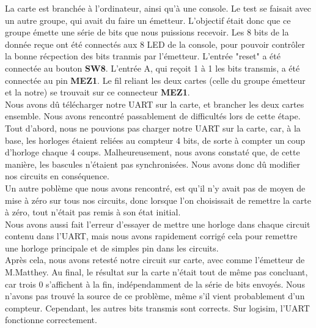 \documentclass[a4paper]{article} %
\begin{document}
\begin{tcolorbox}[colframe=Monokaimagenta,colback=white]
La carte est branchée à l'ordinateur, ainsi qu'à une console. Le test se faisait avec un autre groupe, qui avait du faire un émetteur. L'objectif était donc que ce groupe émette une série de bits que nous puissions recevoir.
Les 8 bits de la donnée reçue ont été connectés aux 8 LED de la console, pour pouvoir contrôler la bonne récpection des bits tranmis par l'émetteur. L'entrée "reset" a été connectée au bouton \textbf{SW8}. L'entrée A, qui reçoit 1 à 1 les bits transmis, a été connectée au pin \textbf{MEZ1}. Le fil reliant les deux cartes (celle du groupe émetteur et la notre) se trouvait sur ce connecteur \textbf{MEZ1}.\\
Nous avons dû télécharger notre UART sur la carte, et brancher les deux cartes ensemble.
Nous avons rencontré passablement de difficultés lors de cette étape. Tout d'abord, nous ne pouvions pas charger notre UART sur la carte, car, à la base, les horloges étaient reliées au compteur 4 bits, de sorte à compter un coup d'horloge chaque 4 coups. Malheureusement, nous avons constaté que, de cette manière, les bascules n'étaient pas synchronisées. Nous avons donc dû modifier nos circuits en conséquence.\\
Un autre poblème que nous avons rencontré, est qu'il n'y avait pas de moyen de mise à zéro sur tous nos circuits, donc lorsque l'on choisissait de remettre la carte à zéro, tout n'était pas remis à son état initial.\\
Nous avons aussi fait l'erreur d'essayer de mettre une horloge dans chaque circuit contenu dans l'UART, mais nous avons rapidement corrigé cela pour remettre une horloge principale et de simples pin dans les circuits.\\
Après cela, nous avons retesté notre circuit sur carte, avec comme l'émetteur de M.Matthey. Au final, le résultat sur la carte n'était tout de même pas concluant, car trois $0$ s'affichent à la fin, indépendamment de la série de bits envoyés. Nous n'avons pas trouvé la source de ce problème, même s'il vient probablement d'un compteur. Cependant, les autres bits transmis sont corrects. Sur logisim, l'UART fonctionne correctement.

\end{tcolorbox}
\end{document}
